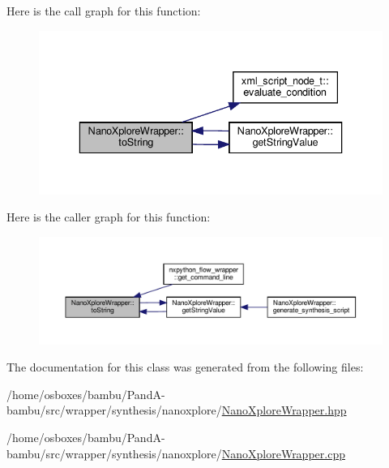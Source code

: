 Here is the call graph for this function\+:
\nopagebreak
\begin{figure}[H]
\begin{center}
\leavevmode
\includegraphics[width=336pt]{da/d28/classNanoXploreWrapper_ac21600c8f4e069a14f07a91560caf0c1_cgraph}
\end{center}
\end{figure}
Here is the caller graph for this function\+:
\nopagebreak
\begin{figure}[H]
\begin{center}
\leavevmode
\includegraphics[width=350pt]{da/d28/classNanoXploreWrapper_ac21600c8f4e069a14f07a91560caf0c1_icgraph}
\end{center}
\end{figure}


The documentation for this class was generated from the following files\+:\begin{DoxyCompactItemize}
\item 
/home/osboxes/bambu/\+Pand\+A-\/bambu/src/wrapper/synthesis/nanoxplore/\hyperlink{NanoXploreWrapper_8hpp}{Nano\+Xplore\+Wrapper.\+hpp}\item 
/home/osboxes/bambu/\+Pand\+A-\/bambu/src/wrapper/synthesis/nanoxplore/\hyperlink{NanoXploreWrapper_8cpp}{Nano\+Xplore\+Wrapper.\+cpp}\end{DoxyCompactItemize}
